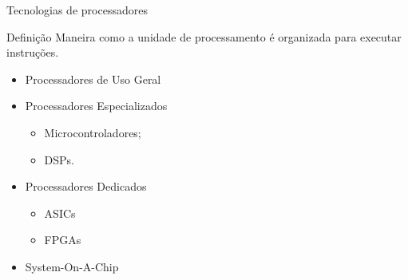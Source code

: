 \begin{frame}{Tecnologias de processadores}

    \begin{block}{Definição}
        Maneira como a unidade de processamento é 
        organizada para executar instruções.
    \end{block}


    \begin{itemize}
        \item Processadores de Uso Geral
        \item Processadores Especializados
        \begin{itemize}
            \item Microcontroladores;
            \item DSPs.
        \end{itemize}
        \item Processadores Dedicados
        \begin{itemize}
            \item ASICs
            \item FPGAs
        \end{itemize}
        \item System-On-A-Chip
    \end{itemize}



\end{frame}


        




